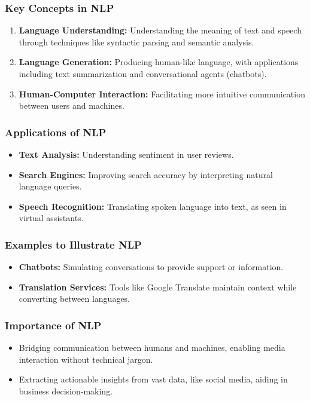 \documentclass[aspectratio=169]{beamer}
\begin{document}
\begin{frame}
    \frametitle{Key Concepts in NLP}
    \begin{enumerate}
        \item \textbf{Language Understanding:} 
        Understanding the meaning of text and speech through techniques like syntactic parsing and semantic analysis.
        
        \item \textbf{Language Generation:}
        Producing human-like language, with applications including text summarization and conversational agents (chatbots).
        
        \item \textbf{Human-Computer Interaction:}
        Facilitating more intuitive communication between users and machines.
    \end{enumerate}
\end{frame}

\begin{frame}
    \frametitle{Applications of NLP}
    \begin{itemize}
        \item \textbf{Text Analysis:} Understanding sentiment in user reviews.
        \item \textbf{Search Engines:} Improving search accuracy by interpreting natural language queries.
        \item \textbf{Speech Recognition:} Translating spoken language into text, as seen in virtual assistants.
    \end{itemize}
\end{frame}

\begin{frame}
    \frametitle{Examples to Illustrate NLP}
    \begin{itemize}
        \item \textbf{Chatbots:} Simulating conversations to provide support or information.
        \item \textbf{Translation Services:} Tools like Google Translate maintain context while converting between languages.
    \end{itemize}
\end{frame}

\begin{frame}
    \frametitle{Importance of NLP}
    \begin{itemize}
        \item Bridging communication between humans and machines, enabling media interaction without technical jargon.
        \item Extracting actionable insights from vast data, like social media, aiding in business decision-making.
    \end{itemize}
\end{frame}
\end{document}
